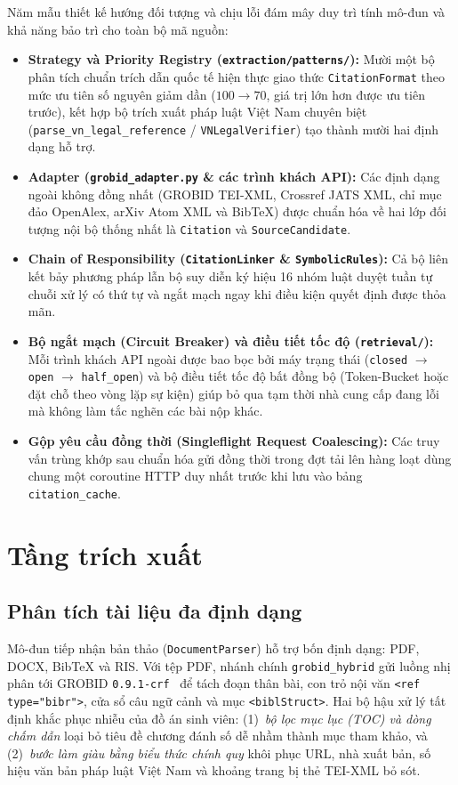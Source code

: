 Năm mẫu thiết kế hướng đối tượng và chịu lỗi đám mây duy trì tính mô-đun và khả năng bảo trì cho toàn bộ mã nguồn:
\begin{itemize}
    \item \textbf{Strategy và Priority Registry (\texttt{extraction/patterns/}):} Mười một bộ phân tích chuẩn trích dẫn quốc tế hiện thực giao thức \texttt{CitationFormat} theo mức ưu tiên số nguyên giảm dần ($100 \rightarrow 70$, giá trị lớn hơn được ưu tiên trước), kết hợp bộ trích xuất pháp luật Việt Nam chuyên biệt (\texttt{parse\_vn\_legal\_reference} / \texttt{VNLegalVerifier}) tạo thành mười hai định dạng hỗ trợ.
    \item \textbf{Adapter (\texttt{grobid\_adapter.py} \& các trình khách API):} Các định dạng ngoài không đồng nhất (GROBID TEI-XML, Crossref JATS XML, chỉ mục đảo OpenAlex, arXiv Atom XML và BibTeX) được chuẩn hóa về hai lớp đối tượng nội bộ thống nhất là \texttt{Citation} và \texttt{SourceCandidate}.
    \item \textbf{Chain of Responsibility (\texttt{CitationLinker} \& \texttt{SymbolicRules}):} Cả bộ liên kết bảy phương pháp lẫn bộ suy diễn ký hiệu 16 nhóm luật duyệt tuần tự chuỗi xử lý có thứ tự và ngắt mạch ngay khi điều kiện quyết định được thỏa mãn.
    \item \textbf{Bộ ngắt mạch (Circuit Breaker) và điều tiết tốc độ (\texttt{retrieval/}):} Mỗi trình khách API ngoài được bao bọc bởi máy trạng thái (\texttt{closed} $\rightarrow$ \texttt{open} $\rightarrow$ \texttt{half\_open}) và bộ điều tiết tốc độ bất đồng bộ (Token-Bucket hoặc đặt chỗ theo vòng lặp sự kiện) giúp bỏ qua tạm thời nhà cung cấp đang lỗi mà không làm tắc nghẽn các bài nộp khác.
    \item \textbf{Gộp yêu cầu đồng thời (Singleflight Request Coalescing):} Các truy vấn trùng khớp sau chuẩn hóa gửi đồng thời trong đợt tải lên hàng loạt dùng chung một coroutine HTTP duy nhất trước khi lưu vào bảng \texttt{citation\_cache}.
\end{itemize}

\section{Tầng trích xuất}

\subsection{Phân tích tài liệu đa định dạng}

Mô-đun tiếp nhận bản thảo (\texttt{DocumentParser}) hỗ trợ bốn định dạng: PDF, DOCX, BibTeX và RIS. Với tệp PDF, nhánh chính \texttt{grobid\_hybrid} gửi luồng nhị phân tới GROBID \texttt{0.9.1-crf}~\cite{Lopez2009} để tách đoạn thân bài, con trỏ nội văn \texttt{<ref type="bibr">}, cửa sổ câu ngữ cảnh và mục \texttt{<biblStruct>}. Hai bộ hậu xử lý tất định khắc phục nhiễu của đồ án sinh viên: (1)~\emph{bộ lọc mục lục (TOC) và dòng chấm dẫn} loại bỏ tiêu đề chương đánh số dễ nhầm thành mục tham khảo, và (2)~\emph{bước làm giàu bằng biểu thức chính quy} khôi phục URL, nhà xuất bản, số hiệu văn bản pháp luật Việt Nam và khoảng trang bị thẻ TEI-XML bỏ sót.

